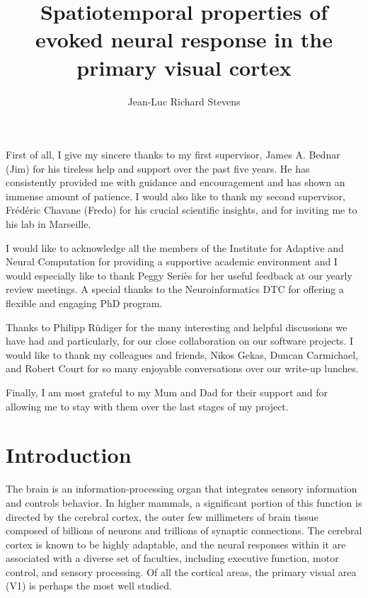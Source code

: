 \documentclass[phd,ianc,twoside]{infthesis}
\title{Spatiotemporal properties of evoked neural response in the primary visual cortex}
\author{Jean-Luc Richard Stevens}
\begin{document}
\begin{preliminary}
\maketitle

\begin{acknowledgements}

First of all, I give my sincere thanks to my first supervisor, James
A. Bednar (Jim) for his tireless help and support over the past five
years. He has consistently provided me with guidance and encouragement
and has shown an immense amount of patience. I would also like to thank
my second supervisor, Fr\'{e}d\'{e}ric Chavane (Fredo) for his crucial
scientific insights, and for inviting me to his lab in Marseille.

I would like to acknowledge all the members of the Institute for
Adaptive and Neural Computation for providing a supportive academic
environment and I would especially like to thank Peggy Seri\`{e}s for
her useful feedback at our yearly review meetings. A special thanks to
the Neuroinformatics DTC for offering a flexible and engaging PhD
program.

Thanks to Philipp R\"{u}diger for the many interesting and helpful
discussions we have had and particularly, for our close collaboration on
our software projects.  I would like to thank my colleagues and friends,
Nikos Gekas, Duncan Carmichael, and Robert Court for so many enjoyable
conversations over our write-up lunches.

Finally, I am most grateful to my Mum and Dad for their support and for
allowing me to stay with them over the last stages of my project.

\end{acknowledgements}

\standarddeclaration
\tableofcontents


\end{preliminary}


\chapter{Introduction}
\label{chapter:introduction}

The brain is an information-processing organ that integrates sensory
information and controls behavior. In higher mammals, a significant
portion of this function is directed by the cerebral cortex, the outer
few millimeters of brain tissue composed of billions of neurons and
trillions of synaptic connections. The cerebral cortex is known to be
highly adaptable, and the neural responses within it are associated with
a diverse set of faculties, including executive function, motor control,
and sensory processing. Of all the cortical areas, the primary visual
area (V1) is perhaps the most well studied.
\end{document}
